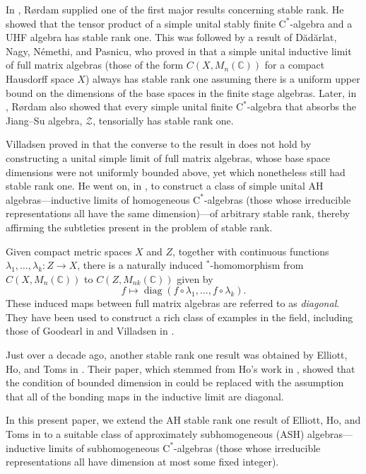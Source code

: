 \documentclass[12pt]{amsart}
\numberwithin{equation}{section}
\theoremstyle{definition}
\theoremstyle{remark}
\newcommand{\diag}{\operatorname{diag}}
\begin{document}
In \cite{Ror}, R\o{}rdam supplied one of the first major results concerning stable rank. He showed that the tensor product of a simple unital stably finite $\mathrm{C}^{*}$-algebra and a UHF algebra has stable rank one. This was followed by a result of D\u{a}d\u{a}rlat, Nagy,  N{\'{e}}methi, and Pasnicu, who proved in \cite{4Rom} that a simple unital inductive limit of full matrix algebras (those of the form $C(X,M_{n}(\mathbb{C}))$ for a compact Hausdorff space $X$) always has stable rank one assuming there is a uniform upper bound on the dimensions of the base spaces in the finite stage algebras. Later, in \cite{Ror2}, R\o{}rdam also showed that every simple unital finite $\mathrm{C}^{*}$-algebra that absorbs the Jiang--Su algebra, $\mathcal{Z}$, tensorially has stable rank one. 

Villadsen proved in \cite{vil1} that the converse to the result in \cite{4Rom} does not hold by constructing a unital simple limit of full matrix algebras, whose base space dimensions were not uniformly bounded above, yet which nonetheless still had stable rank one. He went on, in \cite{vil2}, to construct a class of simple unital AH algebras---inductive limits of homogeneous $\mathrm{C}^{*}$-algebras (those whose irreducible representations all have the same dimension)---of arbitrary stable rank, thereby affirming the subtleties present in the problem of stable rank. 

Given compact metric spaces $X$ and $Z$, together with continuous functions $\lambda_{1},\ldots,\lambda_{k}\colon Z\to X$, there is a naturally induced $^*$-homomorphism from $C(X,M_{n}(\mathbb{C}))$ to $C(Z,M_{nk}(\mathbb{C}))$ given by
$$
f\mapsto\diag(f\circ\lambda_{1},\ldots,f\circ\lambda_{k}).
$$
These induced maps between full matrix algebras are referred to as \textit{diagonal}. They have been used to construct a rich class of examples in the field, including those of Goodearl in \cite{Good} and Villadsen in \cite{vil1}.

Just over a decade ago, another stable rank one result was obtained by Elliott, Ho, and Toms in \cite{EHT}. Their paper, which stemmed from Ho's work in \cite{Ho}, showed that the condition of bounded dimension in \cite{4Rom} could be replaced with the assumption that all of the bonding maps in the inductive limit are diagonal.

In this present paper, we extend the AH stable rank one result of Elliott, Ho, and Toms in \cite{EHT} to a suitable class of approximately subhomogeneous (ASH) algebras---inductive limits of subhomogeneous $\mathrm{C}^{*}$-algebras (those whose irreducible representations all have dimension at most some fixed integer). 
\end{document}
